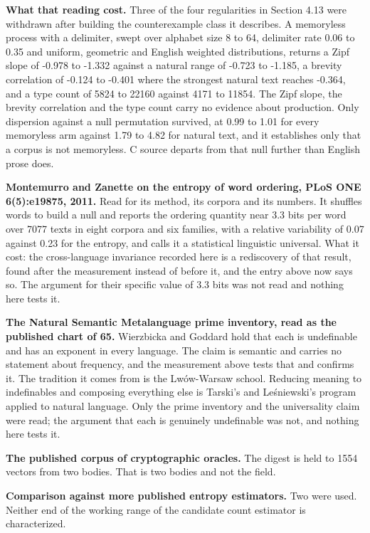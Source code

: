 \textbf{What that reading cost.} Three of the four regularities in Section 4.13 were withdrawn after building the counterexample class it describes. A memoryless process with a delimiter, swept over alphabet size 8 to 64, delimiter rate 0.06 to 0.35 and uniform, geometric and English weighted distributions, returns a Zipf slope of -0.978 to -1.332 against a natural range of -0.723 to -1.185, a brevity correlation of -0.124 to -0.401 where the strongest natural text reaches -0.364, and a type count of 5824 to 22160 against 4171 to 11854. The Zipf slope, the brevity correlation and the type count carry no evidence about production. Only dispersion against a null permutation survived, at 0.99 to 1.01 for every memoryless arm against 1.79 to 4.82 for natural text, and it establishes only that a corpus is not memoryless. C source departs from that null further than English prose does.

\textbf{Montemurro and Zanette on the entropy of word ordering, PLoS ONE 6(5):e19875, 2011.} Read for its method, its corpora and its numbers. It shuffles words to build a null and reports the ordering quantity near 3.3 bits per word over 7077 texts in eight corpora and six families, with a relative variability of 0.07 against 0.23 for the entropy, and calls it a statistical linguistic universal. What it cost: the cross-language invariance recorded here is a rediscovery of that result, found after the measurement instead of before it, and the entry above now says so. The argument for their specific value of 3.3 bits was not read and nothing here tests it.

\textbf{The Natural Semantic Metalanguage prime inventory, read as the published chart of 65.} Wierzbicka and Goddard hold that each is undefinable and has an exponent in every language. The claim is semantic and carries no statement about frequency, and the measurement above tests that and confirms it. The tradition it comes from is the Lwów-Warsaw school. Reducing meaning to indefinables and composing everything else is Tarski's and Leśniewski's program applied to natural language. Only the prime inventory and the universality claim were read; the argument that each is genuinely undefinable was not, and nothing here tests it.

\textbf{The published corpus of cryptographic oracles.} The digest is held to 1554 vectors from two bodies. That is two bodies and not the field.

\textbf{Comparison against more published entropy estimators.} Two were used. Neither end of the working range of the candidate count estimator is characterized.

